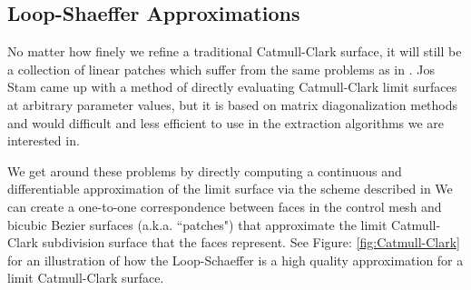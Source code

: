 \documentclass[12pt, letterpaper]{article}
\begin{document}
	\subsection{Loop-Shaeffer Approximations}

		No matter how finely we refine a traditional Catmull-Clark surface, it will still be a collection of linear patches which suffer from the same problems as
		in \cite{Eisemann08}. Jos Stam came up with a method of directly evaluating Catmull-Clark limit surfaces at arbitrary parameter values\cite{Stam98},
		but it is based on matrix diagonalization methods and would difficult and less efficient to use in the extraction algorithms we are interested in.
		
		We get around these problems by directly computing a continuous and differentiable approximation of the limit surface
		via the scheme described in \cite{Loop}
		We can create a one-to-one correspondence between faces in the control mesh and bicubic Bezier surfaces (a.k.a. ``patches") that approximate the 
		limit Catmull-Clark subdivision surface that the faces represent. See Figure: \ref{fig:Catmull-Clark} for an illustration of how the Loop-Schaeffer is
		a high quality approximation for a limit Catmull-Clark surface.
		
\end{document}
